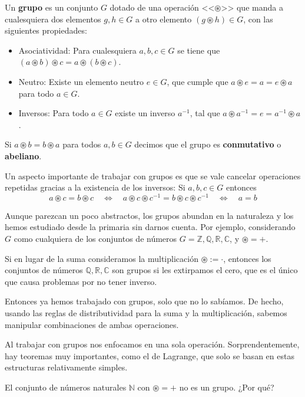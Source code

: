 \begin{definicion}
Un {\bf grupo} es un conjunto $G$ dotado de una operación <<$\circledast$>> que manda a cualesquiera dos elementos $g,h\in G$ a otro elemento $(g\circledast h)\in G$, con las siguientes propiedades:
\begin{itemize}
    \item Asociatividad: Para cualesquiera  $a,b,c\in G$ se tiene que $(a\circledast b)\circledast c =a\circledast (b\circledast c)$.
    \item Neutro: Existe un elemento neutro $e\in G$, que cumple que $a\circledast e=a=e\circledast a$ para todo $a\in G$.
    \item Inversos: Para todo $a\in G$ existe un inverso $a^{-1}$, tal que $a\circledast a^{-1}=e= a^{-1}\circledast a$.
\end{itemize}
Si $a\circledast b=b\circledast a$ para todos $a,b\in G$ decimos que el grupo es {\bf conmutativo} o {\bf abeliano}.
\end{definicion}

Un aspecto importante de trabajar con grupos es que se vale cancelar operaciones repetidas gracias a la existencia de los inversos: Si $a,b,c\in G$ entonces
$$a\circledast c=b\circledast c\quad  \Longleftrightarrow \quad a\circledast c\circledast c^{-1}=b\circledast c\circledast c^{-1} \quad  \Longleftrightarrow \quad a=b $$

Aunque parezcan un poco abstractos, los grupos abundan en la naturaleza y los hemos estudiado desde la primaria sin darnos cuenta. Por ejemplo, considerando $G$ como cualquiera de los conjuntos de números $G=\mathbb Z, \mathbb Q, \mathbb R, \mathbb C$, y $\circledast =+$.

Si en lugar de la suma consideramos la multiplicación $\circledast :=\cdot$, entonces los conjuntos de números $\mathbb Q, \mathbb R, \mathbb C$ son grupos si les extirpamos el cero, que es el único que causa problemas por no tener inverso.  

Entonces ya hemos trabajado con grupos, solo que no lo sabíamos. De hecho, usando las reglas de distributividad para la suma y la multiplicación, sabemos manipular combinaciones de ambas operaciones.

Al trabajar con grupos nos enfocamos en una sola operación. Sorprendentemente, hay teoremas muy importantes, como el de Lagrange, que solo se basan en estas estructuras relativamente simples.

\begin{ejercicio}
El conjunto de números naturales $\mathbb N$ con $\circledast=+$ no es un grupo. ¿Por qué?
\end{ejercicio}

